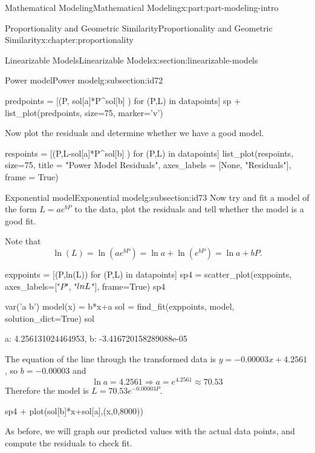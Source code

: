 \documentclass[oneside,10pt,]{book}
\numberwithin{equation}{section}
\begin{document}
\begin{partptx}{Mathematical Modeling}{}{Mathematical Modeling}{}{}{x:part:part-modeling-intro}
\begin{chapterptx}{Proportionality and Geometric Similarity}{}{Proportionality and Geometric Similarity}{}{}{x:chapter:proportionality}
\begin{sectionptx}{Linearizable Models}{}{Linearizable Models}{}{}{x:section:linearizable-models}
\begin{subsectionptx}{Power model}{}{Power model}{}{}{g:subsection:id72}
\begin{sageoutput}
\end{sageoutput}
\begin{sageinput}
predpoints = [(P, sol[a]*P^sol[b] ) for (P,L) in datapoints]
sp + list_plot(predpoints, size=75, marker='v')
\end{sageinput}
Now plot the residuals and determine whether we have a good model.%
\begin{sageinput}
respoints = [(P,L-sol[a]*P^sol[b] ) for (P,L) in datapoints]
list_plot(respoints, size=75, 
	title = "Power Model Residuals", 
	axes_labels = [None, "Residuals"], frame = True)
\end{sageinput}
\end{subsectionptx}
%
%
\typeout{************************************************}
\typeout{************************************************}
%
\begin{subsectionptx}{Exponential model}{}{Exponential model}{}{}{g:subsection:id73}
Now try and fit a model of the form \(L = ae^{bP}\) to the data, plot the residuals and tell whether the model is a good fit.%
\par
Note that%
%
\begin{equation*}
\ln(L) = \ln(ae^{bP}) = \ln a + \ln(e^{bP}) = \ln a + bP.
\end{equation*}
\begin{sageinput}
exppoints = [(P,ln(L)) for (P,L) in datapoints]
sp4 = scatter_plot(exppoints, 
	axes_labels=["$P$", "$\\ln L$"],
    frame=True)
sp4
\end{sageinput}
\begin{sageinput}
var('a b')
model(x) = b*x+a
sol = find_fit(exppoints, model, solution_dict=True)
sol
\end{sageinput}
\begin{sageoutput}
{a: 4.256131024464953, b: -3.416720158289088e-05}
\end{sageoutput}
The equation of the line through the transformed data is \(y = -0.00003x + 4.2561\), so \(b = -0.00003\) and%
%
\begin{equation*}
\ln a = 4.2561 \Longrightarrow a = e^{4.2561} \approx 70.53 
\end{equation*}
Therefore the model is \(L = 70.53e^{-0.00003P}\).%
\begin{sageinput}
sp4 + plot(sol[b]*x+sol[a],(x,0,8000))
\end{sageinput}
As before, we will graph our predicted values with the actual data points, and compute the residuals to check fit.%

\end{subsectionptx}
\end{sectionptx}
\end{chapterptx}
\end{partptx}
\end{document}
